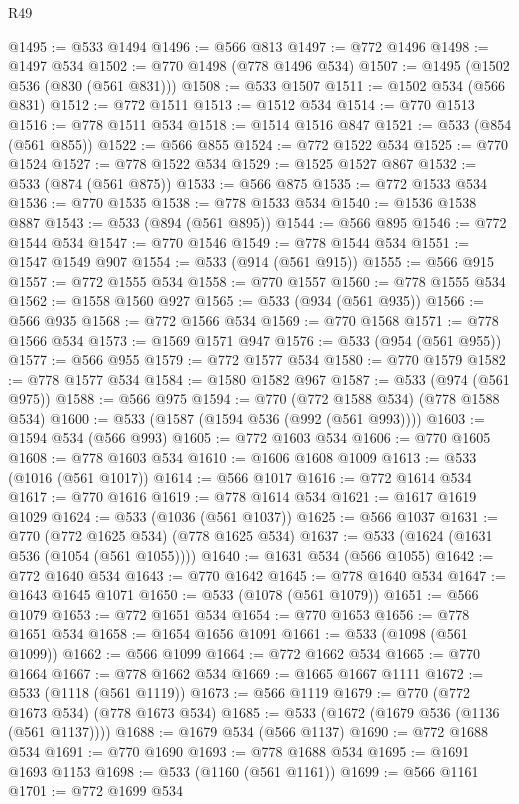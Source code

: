 \begin{lexlean}{R49}
\begin{coremodule}
@1495 := @533 @1494
@1496 := @566 @813
@1497 := @772 @1496
@1498 := @1497 @534
@1502 := @770 @1498 (@778 @1496 @534)
@1507 := @1495 (@1502 @536 (@830 (@561 @831)))
@1508 := @533 @1507
@1511 := @1502 @534 (@566 @831)
@1512 := @772 @1511
@1513 := @1512 @534
@1514 := @770 @1513
@1516 := @778 @1511 @534
@1518 := @1514 @1516 @847
@1521 := @533 (@854 (@561 @855))
@1522 := @566 @855
@1524 := @772 @1522 @534
@1525 := @770 @1524
@1527 := @778 @1522 @534
@1529 := @1525 @1527 @867
@1532 := @533 (@874 (@561 @875))
@1533 := @566 @875
@1535 := @772 @1533 @534
@1536 := @770 @1535
@1538 := @778 @1533 @534
@1540 := @1536 @1538 @887
@1543 := @533 (@894 (@561 @895))
@1544 := @566 @895
@1546 := @772 @1544 @534
@1547 := @770 @1546
@1549 := @778 @1544 @534
@1551 := @1547 @1549 @907
@1554 := @533 (@914 (@561 @915))
@1555 := @566 @915
@1557 := @772 @1555 @534
@1558 := @770 @1557
@1560 := @778 @1555 @534
@1562 := @1558 @1560 @927
@1565 := @533 (@934 (@561 @935))
@1566 := @566 @935
@1568 := @772 @1566 @534
@1569 := @770 @1568
@1571 := @778 @1566 @534
@1573 := @1569 @1571 @947
@1576 := @533 (@954 (@561 @955))
@1577 := @566 @955
@1579 := @772 @1577 @534
@1580 := @770 @1579
@1582 := @778 @1577 @534
@1584 := @1580 @1582 @967
@1587 := @533 (@974 (@561 @975))
@1588 := @566 @975
@1594 := @770 (@772 @1588 @534) (@778 @1588 @534)
@1600 := @533 (@1587 (@1594 @536 (@992 (@561 @993))))
@1603 := @1594 @534 (@566 @993)
@1605 := @772 @1603 @534
@1606 := @770 @1605
@1608 := @778 @1603 @534
@1610 := @1606 @1608 @1009
@1613 := @533 (@1016 (@561 @1017))
@1614 := @566 @1017
@1616 := @772 @1614 @534
@1617 := @770 @1616
@1619 := @778 @1614 @534
@1621 := @1617 @1619 @1029
@1624 := @533 (@1036 (@561 @1037))
@1625 := @566 @1037
@1631 := @770 (@772 @1625 @534) (@778 @1625 @534)
@1637 := @533 (@1624 (@1631 @536 (@1054 (@561 @1055))))
@1640 := @1631 @534 (@566 @1055)
@1642 := @772 @1640 @534
@1643 := @770 @1642
@1645 := @778 @1640 @534
@1647 := @1643 @1645 @1071
@1650 := @533 (@1078 (@561 @1079))
@1651 := @566 @1079
@1653 := @772 @1651 @534
@1654 := @770 @1653
@1656 := @778 @1651 @534
@1658 := @1654 @1656 @1091
@1661 := @533 (@1098 (@561 @1099))
@1662 := @566 @1099
@1664 := @772 @1662 @534
@1665 := @770 @1664
@1667 := @778 @1662 @534
@1669 := @1665 @1667 @1111
@1672 := @533 (@1118 (@561 @1119))
@1673 := @566 @1119
@1679 := @770 (@772 @1673 @534) (@778 @1673 @534)
@1685 := @533 (@1672 (@1679 @536 (@1136 (@561 @1137))))
@1688 := @1679 @534 (@566 @1137)
@1690 := @772 @1688 @534
@1691 := @770 @1690
@1693 := @778 @1688 @534
@1695 := @1691 @1693 @1153
@1698 := @533 (@1160 (@561 @1161))
@1699 := @566 @1161
@1701 := @772 @1699 @534

\end{coremodule}
\end{lexlean}
